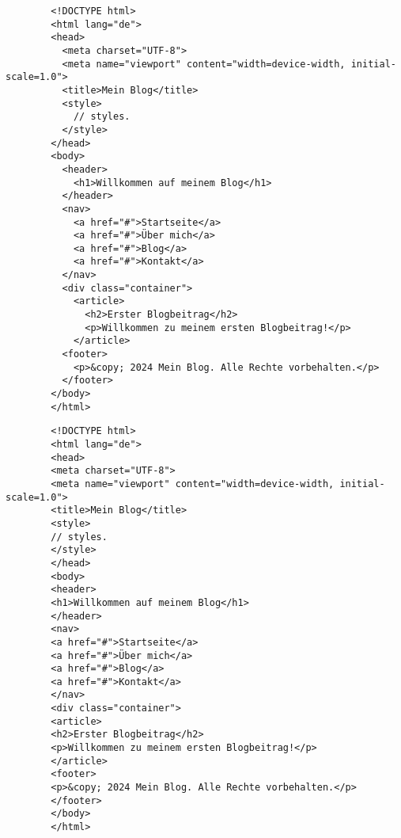 \begin{tcolorbox}[
	enhanced,
	colback=BhtGrey!5!white,
	colframe=BhtGrey!75!black!50,
	title= ChatGPT 3.5
	]
	\begin{verbatim}
		<!DOCTYPE html>
		<html lang="de">
		<head>
		  <meta charset="UTF-8">
		  <meta name="viewport" content="width=device-width, initial-scale=1.0">
		  <title>Mein Blog</title>
		  <style>
		    // styles.
		  </style>
		</head>
		<body>
		  <header>
		    <h1>Willkommen auf meinem Blog</h1>
		  </header>
		  <nav>
		    <a href="#">Startseite</a>
		    <a href="#">Über mich</a>
		    <a href="#">Blog</a>
		    <a href="#">Kontakt</a>
		  </nav>
		  <div class="container">
		    <article>
		      <h2>Erster Blogbeitrag</h2>
		      <p>Willkommen zu meinem ersten Blogbeitrag!</p>
		    </article>
		  <footer>
		    <p>&copy; 2024 Mein Blog. Alle Rechte vorbehalten.</p>
		  </footer>
		</body>
		</html>
	\end{verbatim}
\end{tcolorbox}

\begin{tcolorbox}[
	enhanced,
	colback=BhtGrey!5!white,
	colframe=BhtGrey!75!black!50,
	title= ChatGPT 3.5
	]
	\begin{verbatim}
		<!DOCTYPE html>
		<html lang="de">
		<head>
		<meta charset="UTF-8">
		<meta name="viewport" content="width=device-width, initial-scale=1.0">
		<title>Mein Blog</title>
		<style>
		// styles.
		</style>
		</head>
		<body>
		<header>
		<h1>Willkommen auf meinem Blog</h1>
		</header>
		<nav>
		<a href="#">Startseite</a>
		<a href="#">Über mich</a>
		<a href="#">Blog</a>
		<a href="#">Kontakt</a>
		</nav>
		<div class="container">
		<article>
		<h2>Erster Blogbeitrag</h2>
		<p>Willkommen zu meinem ersten Blogbeitrag!</p>
		</article>
		<footer>
		<p>&copy; 2024 Mein Blog. Alle Rechte vorbehalten.</p>
		</footer>
		</body>
		</html>
	\end{verbatim}
\end{tcolorbox}
